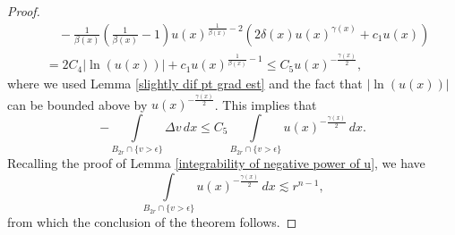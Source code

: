 \documentclass[10pt,a4paper]{amsart}
\begin{document}
\begin{proof}
\begin{align*}
         & \quad - \frac{1}{\beta(x)}\left(\frac{1}{\beta(x)} -1\right)u(x)^{\frac{1}{\beta(x)}-2}\left(2\delta(x)u(x)^{\gamma(x)} + c_1 u(x)\right)\\
         & =  2C_4|\ln(u(x))| + c_1u(x)^{\frac{1}{\beta(x)}-1} \leq C_5 u(x)^{-\frac{\gamma(x)}{2}},
\end{align*}
where we used Lemma \ref{slightly dif pt grad est} and the fact that $|\ln(u(x))|$ can be bounded above by $u(x)^{-\frac{\gamma(x)}{2}}$. This implies that
$$
  -\int\limits_{B_{2r} \cap \{v > \epsilon \}}\Delta v\,dx \leq C_5\int\limits_{B_{2r} \cap \{v > \epsilon \}}u(x)^{-\frac{\gamma(x)}{2}}\,dx. 
$$
Recalling the proof of Lemma \ref{integrability of negative power of u}, we have
$$
	\int\limits_{B_{2r} \cap \{v > \epsilon \}}u(x)^{-\frac{\gamma(x)}{2}}\,dx \lesssim r^{n-1},
$$
from which the conclusion of the theorem follows.
\end{proof}
\end{document}
